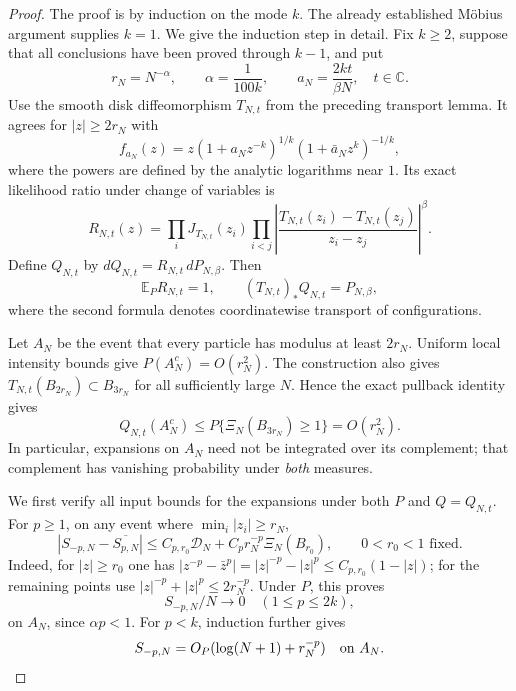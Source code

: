 \documentclass[11pt,a4paper]{article}
\numberwithin{equation}{section}
\theoremstyle{definition}
\theoremstyle{remark}
\begin{document}
\begin{proof}
The proof is by induction on the mode $k$. The already established
M\"obius argument supplies $k=1$. We give the induction step in detail.
Fix $k\ge2$, suppose that all conclusions have been proved through $k-1$,
and put
\[
 r_N=N^{-\alpha},\qquad \alpha=\frac1{100k},\qquad
 a_N=\frac{2kt}{\beta N},\quad t\in\mathbb C.
\]
Use the smooth disk diffeomorphism $T_{N,t}$ from the preceding transport
lemma. It agrees for $|z|\ge2r_N$ with
\[
 f_{a_N}(z)
 =z(1+a_Nz^{-k})^{1/k}(1+\bar a_Nz^k)^{-1/k},
\]
where the powers are defined by the analytic logarithms near $1$.
Its exact likelihood ratio under change of variables is
\[
 R_{N,t}(z)=
 \prod_i J_{T_{N,t}}(z_i)
 \prod_{i<j}\left|\frac{T_{N,t}(z_i)-T_{N,t}(z_j)}{z_i-z_j}\right|^\beta.
\]
Define $Q_{N,t}$ by $dQ_{N,t}=R_{N,t}\,dP_{N,\beta}$. Then
\begin{equation}\label{eq:allmodes-pullback}
 \mathbb E_PR_{N,t}=1,\qquad
 (T_{N,t})_*Q_{N,t}=P_{N,\beta},
\end{equation}
where the second formula denotes coordinatewise transport of configurations.

Let $A_N$ be the event that every particle has modulus at least $2r_N$.
Uniform local intensity bounds give $P(A_N^c)=O(r_N^2)$. The construction
also gives $T_{N,t}(B_{2r_N})\subset B_{3r_N}$ for all sufficiently large
$N$. Hence the exact pullback identity gives
\begin{equation}\label{eq:allmodes-hole-both-laws}
 Q_{N,t}(A_N^c)\le
 P\{\Xi_N(B_{3r_N})\ge1\}=O(r_N^2).
\end{equation}
In particular, expansions on $A_N$ need not be integrated over its
complement; that complement has vanishing probability under \emph{both}
measures.

We first verify all input bounds for the expansions under both $P$ and
$Q=Q_{N,t}$. For $p\ge1$, on any event where $\min_i|z_i|\ge r_N$,
\begin{equation}\label{eq:allmodes-negative-moment}
 |S_{-p,N}-\overline{S_{p,N}}|
 \le C_{p,r_0}\mathcal D_N+C_p r_N^{-p}\Xi_N(B_{r_0}),
 \qquad 0<r_0<1\text{ fixed}.
\end{equation}
Indeed, for $|z|\ge r_0$ one has
$|z^{-p}-\bar z^p|=|z|^{-p}-|z|^p\le C_{p,r_0}(1-|z|)$;
for the remaining points use $|z|^{-p}+|z|^p\le2r_N^{-p}$.
Under $P$, this proves
\[
 S_{-p,N}/N\to0\quad(1\le p\le2k),
\]
on $A_N$, since $\alpha p<1$. For $p<k$, induction further gives
\begin{equation}\label{eq:allmodes-negative-small}
 S_{-p,N}=O_P(\log(N+1)+r_N^{-p})\quad\hbox{on }A_N.
\end{equation}


\end{proof}
\end{document}
